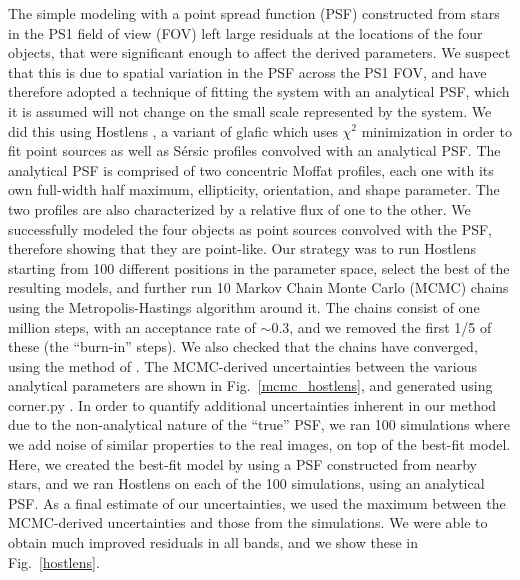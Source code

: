 \documentclass[manuscript]{aastex}
\begin{document}
The simple modeling with a point spread function (PSF) constructed from stars in the PS1 field of view (FOV) left large residuals at the locations of the four objects, that were significant enough to affect the derived parameters. We suspect that this is due to spatial variation in the PSF across the PS1 FOV, and have therefore adopted a technique of fitting the system with an analytical PSF, which it is assumed will not change on the small scale represented by the system. We did this using Hostlens \citep{rus16}, a variant of glafic \citep{ogu10b} which uses $\chi^2$ minimization in order to fit point sources as well as S{\'e}rsic \citep{ser63} profiles convolved with an analytical PSF. The analytical PSF is comprised of two concentric Moffat \citep{mof69} profiles, each one with its own full-width half maximum, ellipticity, orientation, and shape parameter. The two profiles are also characterized by a relative flux of one to the other. We successfully modeled the four objects as point sources convolved with the PSF, therefore showing that they are point-like. Our strategy was to run Hostlens starting from 100 different positions in the parameter space, select the best of the resulting models, and further run 10 Markov Chain Monte Carlo (MCMC) chains using the Metropolis-Hastings algorithm around it. The chains consist of one million steps, with an acceptance rate of $\sim0.3$, and we removed the first 1/5 of these (the ``burn-in'' steps). We also checked that the chains have converged, using the method of \citet{gel95}. The MCMC-derived uncertainties between the various analytical parameters are shown in Fig.~\ref{mcmc_hostlens}, and generated using corner.py \citep{for16}. In order to quantify additional uncertainties inherent in our method due to the non-analytical nature of the ``true'' PSF, we ran 100 simulations where we add noise of similar properties to the real images, on top of the best-fit model. Here, we created the best-fit model by using a PSF constructed from nearby stars, and we ran Hostlens on each of the 100 simulations, using an analytical PSF. As a final estimate of our uncertainties, we used the maximum between the MCMC-derived uncertainties and those from the simulations. We were able to obtain much improved residuals in all bands, and we show these in Fig.~\ref{hostlens}. 
 
\end{document}
